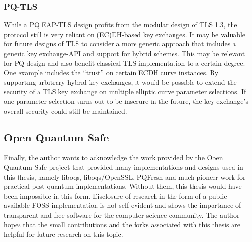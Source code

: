 \subsubsection*{PQ-TLS}
    While a PQ EAP-TLS design profits from the modular design of TLS 1.3, the protocol still is very reliant on (EC)DH-based key exchanges. It may be valuable for future designs of TLS to consider a more generic approach that includes a generic key exchange-API and support for hybrid schemes. This may be relevant for PQ design and also benefit classical TLS implementation to a certain degree. One example includes the ``trust'' on certain ECDH curve instances. By supporting arbitrary hybrid key exchanges, it would be possible to extend the security of a TLS key exchange on multiple elliptic curve parameter selections. If one parameter selection turns out to be insecure in the future, the key exchange's overall security could still be maintained.

\subsection*{Open Quantum Safe}
Finally, the author wants to acknowledge the work provided by the Open Quantum Safe project that provided many implementations and designs used in this thesis, namely liboqs, liboqs/OpenSSL, PQFresh and much pioneer work for practical post-quantum implementations. Without them, this thesis would have been impossible in this form. Disclosure of research in the form of a public available \ac{FOSS} implementation is not self-evident and shows the importance of transparent and free software for the computer science community. The author hopes that the small contributions and the forks associated with this thesis are helpful for future research on this topic.

\endinput